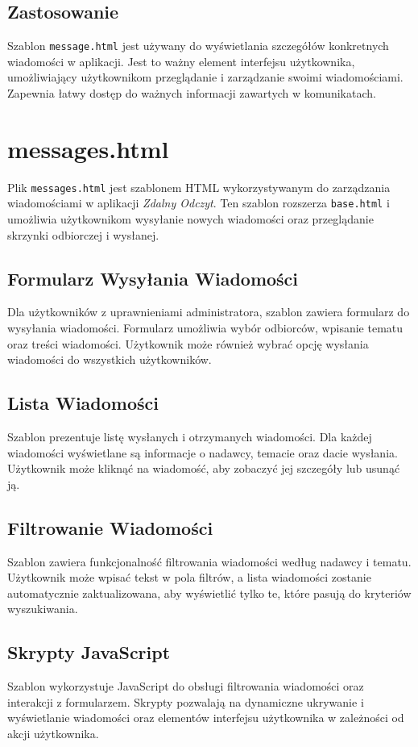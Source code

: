\documentclass[12pt,a4paper]{report}
\begin{document}
\subsection{Zastosowanie}
Szablon \texttt{message.html} jest używany do wyświetlania szczegółów konkretnych wiadomości w aplikacji. Jest to ważny element interfejsu użytkownika, umożliwiający użytkownikom przeglądanie i zarządzanie swoimi wiadomościami. Zapewnia łatwy dostęp do ważnych informacji zawartych w komunikatach.


\section{messages.html}
\label{sec:messages}
Plik \texttt{messages.html} jest szablonem HTML wykorzystywanym do zarządzania wiadomościami w aplikacji \textit{Zdalny Odczyt}. Ten szablon rozszerza \texttt{base.html} i umożliwia użytkownikom wysyłanie nowych wiadomości oraz przeglądanie skrzynki odbiorczej i wysłanej.

\subsection{Formularz Wysyłania Wiadomości}
Dla użytkowników z uprawnieniami administratora, szablon zawiera formularz do wysyłania wiadomości. Formularz umożliwia wybór odbiorców, wpisanie tematu oraz treści wiadomości. Użytkownik może również wybrać opcję wysłania wiadomości do wszystkich użytkowników.

\subsection{Lista Wiadomości}
Szablon prezentuje listę wysłanych i otrzymanych wiadomości. Dla każdej wiadomości wyświetlane są informacje o nadawcy, temacie oraz dacie wysłania. Użytkownik może kliknąć na wiadomość, aby zobaczyć jej szczegóły lub usunąć ją.

\subsection{Filtrowanie Wiadomości}
Szablon zawiera funkcjonalność filtrowania wiadomości według nadawcy i tematu. Użytkownik może wpisać tekst w pola filtrów, a lista wiadomości zostanie automatycznie zaktualizowana, aby wyświetlić tylko te, które pasują do kryteriów wyszukiwania.

\subsection{Skrypty JavaScript}
Szablon wykorzystuje JavaScript do obsługi filtrowania wiadomości oraz interakcji z formularzem. Skrypty pozwalają na dynamiczne ukrywanie i wyświetlanie wiadomości oraz elementów interfejsu użytkownika w zależności od akcji użytkownika.
\end{document}
